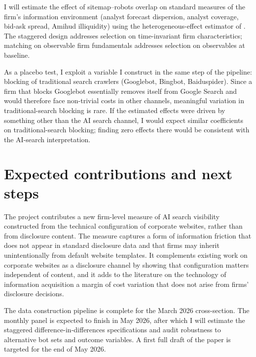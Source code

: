 \documentclass[11pt]{article}
\begin{document}
I will estimate the effect of sitemap--robots overlap on standard measures
of the firm's information environment (analyst forecast dispersion, analyst
coverage, bid-ask spread, Amihud illiquidity) using the heterogeneous-effect
estimator of \citet{callaway2021difference}. The staggered design addresses
selection on time-invariant firm characteristics; matching on observable
firm fundamentals addresses selection on observables at baseline.

As a placebo test, I exploit a variable I construct in the same step of the
pipeline: blocking of traditional search crawlers (Googlebot, Bingbot,
Baiduspider). Since a firm that blocks Googlebot essentially removes itself
from Google Search and would therefore face non-trivial costs in other
channels, meaningful variation in traditional-search blocking is rare. If
the estimated effects were driven by something other than the AI search
channel, I would expect similar coefficients on traditional-search blocking;
finding zero effects there would be consistent with the AI-search
interpretation.

\section{Expected contributions and next steps}

The project contributes a new firm-level measure of AI search visibility
constructed from the technical configuration of corporate websites, rather
than from disclosure content. The measure captures a form of information
friction that does not appear in standard disclosure data and that firms may
inherit unintentionally from default website templates. It complements
existing work on corporate websites as a disclosure channel
\citep{boulland2025website} by showing that configuration matters independent
of content, and it adds to the literature on the technology of information
acquisition \citep{gao2020informativeness, goldstein2023edgar} a margin of
cost variation that does not arise from firms' disclosure decisions.

The data construction pipeline is complete for the March 2026 cross-section.
The monthly panel is expected to finish in May 2026, after which I will
estimate the staggered difference-in-differences specifications and audit
robustness to alternative bot sets and outcome variables. A first full draft
of the paper is targeted for the end of May 2026.
\end{document}
